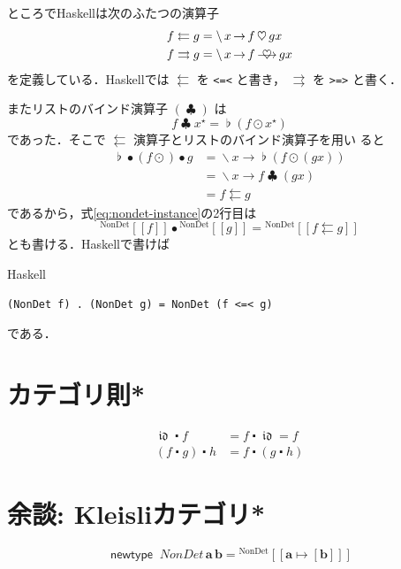 \documentclass[a5paper,twoside,fleqn,draft]{jsbook}
\def\[{\left[\!\left[}
\def\]{\right]\!\right]}
\newcommand{\programminglanguage}[1]{\textsf{#1}}
\newcommand{\haskell}{\programminglanguage{Haskell}}
\newcommand{\code}[1]{\texttt{#1}}
\newenvironment{haskellcode}{\begin{itembox}[r]{\haskell}}{\end{itembox}}
\newcommand{\mKeyword}[1]{\mathsf{#1}} %
\newcommand{\mNewDataTypeKeyword}{\mKeyword{newtype}}
\DeclareMathOperator{\mNewDataType}{\mNewDataTypeKeyword}
\DeclareMathOperator{\mIdCat}{\mathfrak{id}}
\DeclareMathOperator{\mBind}{\heartsuit}
\DeclareMathOperator{\mBindList}{\clubsuit}
\DeclareMathOperator{\mBindRight}{\ooalign{$\longrightarrow$\crcr\hss$\mBind$\hss}}
\DeclareMathOperator{\mComp}{\bullet} %
\DeclareMathOperator{\mCompCat}{\centerdot}
\DeclareMathOperator{\mConcat}{\flat}
\DeclareMathOperator{\mLambda}{\backslash}
\DeclareMathOperator{\mLambdaArrow}{\rightarrow}
\DeclareMathOperator{\mMapList}{\odot}
\DeclareMathOperator{\mMapsTo}{\mapsto}
\newcommand{\mType}[1]{\mathbf{#1}}
\newcommand{\mA}{\mType{a}}
\newcommand{\mB}{\mType{b}}
\newcommand{\mTypeConstructor}[1]{\textit{#1}}
\newcommand{\mValueConstructor}[1]{\mathrm{#1}}
\newcommand{\mGenericValueAssemble}[2]{{}^\mValueConstructor{#1}\[#2\]}
\newcommand{\mList}[1]{{#1}^\mathrm{\star}}
\begin{document}
ところで\haskell は次のふたつの演算子
\begin{align}
  f\leftleftarrows g&=\mLambda x\mLambdaArrow f\mBind gx\\
  f\rightrightarrows g&=\mLambda x\mLambdaArrow f\mBindRight gx
\end{align}
を定義している．\haskell では $\leftleftarrows$ を \code{<=<} と書き，
$\rightrightarrows$ を \code{>=>} と書く．

またリストのバインド演算子 $(\mBindList)$ は
\begin{equation}
  f\mBindList\mList{x}=\mConcat(f\mMapList\mList{x})
\end{equation}
であった．そこで $\leftleftarrows$ 演算子とリストのバインド演算子を用い
ると
\begin{align}
  \mConcat\mComp(f\mMapList)\mComp g
  &=\mLambda x\mLambdaArrow\mConcat(f\mMapList(gx))\\
  &=\mLambda x\mLambdaArrow f\mBindList(gx)\\
  &=f\leftleftarrows g
\end{align}
であるから，式\eqref{eq:nondet-instance}の2行目は
\begin{equation}
  \mGenericValueAssemble{NonDet}{f}\mComp\mGenericValueAssemble{NonDet}{g}
  =\mGenericValueAssemble{NonDet}{f\leftleftarrows g}
\end{equation}
とも書ける．\haskell で書けば
\begin{haskellcode}
\begin{verbatim}
(NonDet f) . (NonDet g) = NonDet (f <=< g)
\end{verbatim}
\end{haskellcode}
である．

\section{カテゴリ則*}

\begin{align}
\mIdCat\mCompCat f&=f\mCompCat\mIdCat=f\\
(f\mCompCat g)\mCompCat h&=f\mCompCat(g\mCompCat h)
\end{align}

\section{余談: Kleisliカテゴリ*}

\begin{equation}
  \mNewDataType\;
  \mTypeConstructor{NonDet}\,\mA\,\mB
  =\mGenericValueAssemble{NonDet}{\mA\mMapsTo[\mB]}
\end{equation}
\end{document}
